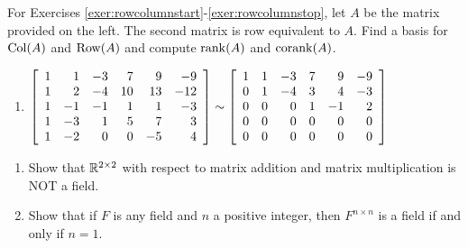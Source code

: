 \noindent For Exercises \ref{exer:rowcolumnstart}-\ref{exer:rowcolumnstop}, let $A$ be the matrix provided on the left. The second matrix is row equivalent to $A$. Find a basis for $\col(A)$ and $\row(A)$ and compute $\rank(A)$ and $\corank(A)$.
\begin{enumerate}[!HW!]
\item\label{exer:rowcolumnstart}\label{exer:rowcolumnstop} $\mtx{rrrrrr}{
1&1&-3&7&9&-9\\
1&2&-4&10&13&-12\\
1&-1&-1&1&1&-3\\
1&-3&1&5&7&3\\
1&-2&0&0&-5&4} 
\sim \mtx{rrrrrr}{
1&1&-3&7&9&-9\\
0&1&-4&3&4&-3\\
0&0&0&1&-1&2\\
0&0&0&0&0&0\\
0&0&0&0&0&0}$ %
\end{enumerate}

\begin{enumerate}[!HW!]
\item Show that $\R^{2\times 2}$ with respect to matrix addition and matrix multiplication is NOT a field. 

\item Show that if $F$ is any field and $n$ a positive integer, then $F^{n\times n}$ is a field if and only if $n=1$. 
\end{enumerate}

 \mbox{}\vfill
 \pagebreak